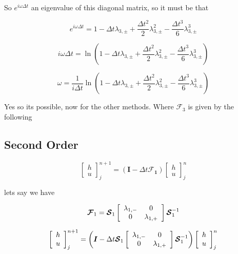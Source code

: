 \documentclass[12pt]{article}
\begin{document}
So $e^{i\omega\Delta t}$ an eigenvalue of this diagonal matrix, so it must be that

\[e^{i\omega\Delta t} = 1 - \Delta t \lambda_{3,\pm} + \frac{\Delta t^2}{2} \lambda_{3,\pm}^2 - \frac{\Delta t^3}{6} \lambda_{3,\pm}^3 \]

\[i\omega\Delta t =  \ln \left(1 - \Delta t \lambda_{3,\pm} + \frac{\Delta t^2}{2} \lambda_{3,\pm}^2 - \frac{\Delta t^3}{6} \lambda_{3,\pm}^3\right) \]

\[\omega = \frac{1}{i \Delta t} \ln \left(1 - \Delta t \lambda_{3,\pm} + \frac{\Delta t^2}{2} \lambda_{3,\pm}^2 - \frac{\Delta t^3}{6} \lambda_{3,\pm}^3\right) \]

Yes so its possible, now for the other methods. Where $\boldsymbol{\mathcal{F}}_3$ is given by the following


\subsection{Second Order}

\[\left[\begin{array}{c}
h \\ u
\end{array}\right]^{n+1}_j = \left(\boldsymbol{I} - \Delta t\boldsymbol{\mathcal{F}_1} \right)\left[\begin{array}{c}
h \\ u
\end{array}\right]^{n}_j  \]



lets say we have 

\[\boldsymbol{\mathcal{F}}_1 = \boldsymbol{\mathcal{S}}_1 \left[\begin{array}{c c}
\lambda_{1,-}  & 0 \\0  & \lambda_{1,+}
\end{array}\right] \boldsymbol{\mathcal{S}}_1^{-1}  \]


\[\left[\begin{array}{c}
h \\ u
\end{array}\right]^{n+1}_j = \left(\boldsymbol{I} - \Delta t\boldsymbol{\mathcal{S}}_1 \left[\begin{array}{c c}
\lambda_{1,-}  & 0 \\0  & \lambda_{1,+}
\end{array}\right] \boldsymbol{\mathcal{S}}_1^{-1} \right)\left[\begin{array}{c}
h \\ u
\end{array}\right]^{n}_j  \]
\end{document}
